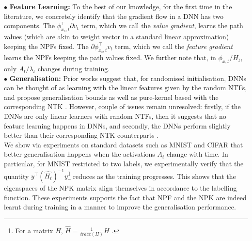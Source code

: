 \documentclass{article}
\begin{document}
\begin{comment}
$\bullet$ \textbf{Feature Learning:} To the best of our knowledge, for the first time in the literature, we concretely identify that the gradient flow in a DNN has two components. The $\phi^\top_{x_s,t} {\partial} v_t $ term, which we call the \emph{value gradient}, learns the path values (which are akin to weight vector in a standard linear approximation) keeping the NPFs fixed. The $ {\partial} \phi^\top_{x_s,t} v_t$ term, which we call the \emph{feature gradient} learns the NPFs keeping the path values fixed. We further note that, in $\phi_{x,t}/H_t$, only $A_t/\lambda_t$ changes during training. %
\end{comment}
$\bullet$ \textbf{Feature Learning:} To the best of our knowledge, for the first time in the literature, we concretely identify that the gradient flow in a DNN has two components. The $\phi^\top_{x_s,t} {\partial} v_t $ term, which we call the \emph{value gradient}, learns the path values (which are akin to weight vector in a standard linear approximation) keeping the NPFs fixed. The $ {\partial} \phi^\top_{x_s,t} v_t$ term, which we call the \emph{feature gradient} learns the NPFs keeping the path values fixed. We further note that, in $\phi_{x,t}/H_t$, only $A_t/\lambda_t$ changes during training.  \hfill\\
$\bullet$ \textbf{Generalisation:} Prior works \cite{arorafine,aroraker,caogu} suggest that, for randomised initialisation, DNNs can be thought of as learning with the linear features given by the random NTFs, and propose  generalisation bounds as well as pure-kernel based with the corresponding NTK \cite{}. However, couple of issues remain unresolved: firstly, if the DNNs are only linear learners with random NTFs, then it suggests that no feature learning happens in DNNs, and secondly, the DNNs perform slightly better than their corresponding NTK counterparts \cite{aroraker,lee}. \hfill\\
We show via experiments on standard datasets such as MNIST and CIFAR that better generalisation happens when the activations $A_t$ change with time. In particular, for MNIST restricted to two labels, we experimentally verify that the quantity $y^\top (\widehat{H_t})^{-1}y$\footnote{For a matrix $H$, $\hat{H}=\frac{1}{trace(H)}H$ .} reduces as the training progresses. This shows that the eigenspaces of the NPK matrix align themselves in accordance to the labelling function. These experiments supports the fact that NPF and the NPK are indeed learnt during training in a manner to improve the generalisation performance. 
\end{document}
